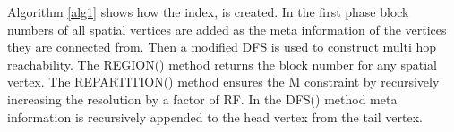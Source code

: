 Algorithm \ref{alg1} shows how the index, {\grpspatial} is created. In the first phase block numbers of all spatial vertices are added as the meta information of the vertices they are connected from. Then a modified DFS is used to construct multi hop reachability. The REGION() method returns the block number for any spatial vertex. The REPARTITION() method ensures the M constraint by recursively increasing the resolution by a factor of RF. In the DFS() method meta information is recursively appended to the head vertex from the tail vertex.


